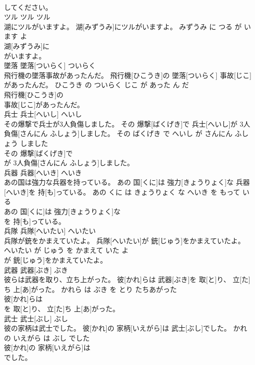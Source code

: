\documentclass[8pt]{extreport}
\begin{document}
\begin{CJK}{UTF8}{min}
\\	してください。			
\\	ツル	ツル	ツル	
\\	湖にツルがいますよ。	湖[みずうみ]にツルがいますよ。	みずうみ に つる が います よ	
\\	湖[みずうみ]に
\\	がいますよ。			
\\	墜落	墜落[ついらく]	ついらく	
\\	飛行機の墜落事故があったんだ。	飛行機[ひこうき]の 墜落[ついらく] 事故[じこ]があったんだ。	ひこうき の ついらく じこ が あった ん だ	
\\	飛行機[ひこうき]の
\\	事故[じこ]があったんだ。			
\\	兵士	兵士[へいし]	へいし	
\\	その爆撃で兵士が3人負傷しました。	その 爆撃[ばくげき]で 兵士[へいし]が 3人負傷[さんにん ふしょう]しました。	その ばくげき で へいし が さんにん ふしょう しました	
\\	その 爆撃[ばくげき]で
\\	が 3人負傷[さんにん ふしょう]しました。			
\\	兵器	兵器[へいき]	へいき	
\\	あの国は強力な兵器を持っている。	あの 国[くに]は 強力[きょうりょく]な 兵器[へいき]を 持[も]っている。	あの くに は きょうりょく な へいき を もって いる	
\\	あの 国[くに]は 強力[きょうりょく]な
\\	を 持[も]っている。			
\\	兵隊	兵隊[へいたい]	へいたい	
\\	兵隊が銃をかまえていたよ。	兵隊[へいたい]が 銃[じゅう]をかまえていたよ。	へいたい が じゅう を かまえて いた よ	
\\	が 銃[じゅう]をかまえていたよ。			
\\	武器	武器[ぶき]	ぶき	
\\	彼らは武器を取り、立ち上がった。	彼[かれ]らは 武器[ぶき]を 取[と]り、 立[た]ち 上[あ]がった。	かれら は ぶき を とり たちあがった	
\\	彼[かれ]らは
\\	を 取[と]り、 立[た]ち 上[あ]がった。			
\\	武士	武士[ぶし]	ぶし	
\\	彼の家柄は武士でした。	彼[かれ]の 家柄[いえがら]は 武士[ぶし]でした。	かれ の いえがら は ぶし でした	
\\	彼[かれ]の 家柄[いえがら]は
\\	でした。			

\end{CJK}
\end{document}
